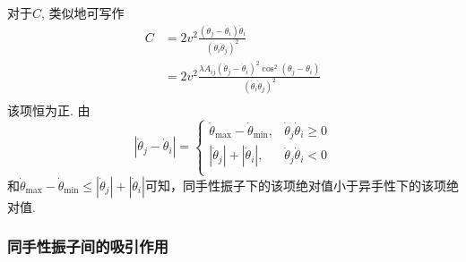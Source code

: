 \documentclass{article}
\begin{document}
对于$C$, 类似地可写作
$$
\begin{aligned}
	C&=2v^2\frac{\left( \dot{\theta}_j-\dot{\theta}_i \right) \ddot{\theta}_i}{\left( \dot{\theta}_i\dot{\theta}_j \right) ^2}\\
	&=2v^2\frac{\lambda A_{ij}\left( \dot{\theta}_j-\dot{\theta}_i \right) ^2\cos ^2\left( \theta _j-\theta _i \right)}{\left( \dot{\theta}_i\dot{\theta}_j \right) ^2}\\
\end{aligned}
$$
该项恒为正. 
由$$
\left| \dot{\theta}_j-\dot{\theta}_i \right|=\begin{cases}
	\dot{\theta}_{\max}-\dot{\theta}_{\min},&		\dot{\theta}_j\dot{\theta}_i\geqslant 0\\
	\left| \dot{\theta}_j \right|+\left| \dot{\theta}_i \right|,&		\dot{\theta}_j\dot{\theta}_i<0\\
\end{cases}
$$和$
\dot{\theta}_{\max}-\dot{\theta}_{\min}\leqslant \left| \dot{\theta}_j \right|+\left| \dot{\theta}_i \right|
$可知，同手性振子下的该项绝对值小于异手性下的该项绝对值.


\subsubsection{同手性振子间的吸引作用}
\end{document}
